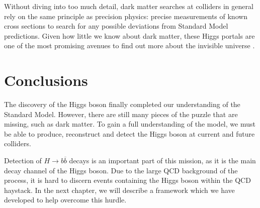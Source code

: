 \documentclass[10pt,a4paper]{book}
\begin{document}
Without diving into too much detail, dark matter searches at colliders in general rely on the same principle as precision physics: precise measurements of known cross sections to search for any possible deviations from Standard Model predictions. Given how little we know about dark matter, these Higgs portals are one of the most promising avenues to find out more about the invisible universe \cite{Arcadi:2019lka}.

\section{Conclusions}
The discovery of the Higgs boson finally completed our understanding of the Standard Model. However, there are still many pieces of the puzzle that are missing, such as dark matter. To gain a full understanding of the model, we must be able to produce, reconstruct and detect the Higgs boson at current and future colliders. 

Detection of $H\rightarrow b\overline{b}$ decays is an important part of this mission, as it is the main decay channel of the Higgs boson. Due to the large QCD background of the process, it is hard to discern events containing the Higgs boson within the QCD haystack. In the next chapter, we will describe a framework which we have developed to help overcome this hurdle.
\end{document}
